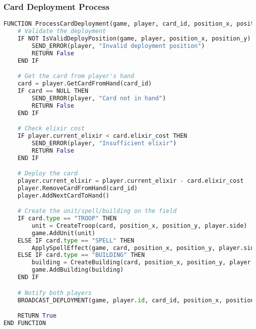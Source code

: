 \documentclass{article}
\begin{document}
\subsubsection{Card Deployment Process}
\begin{lstlisting}[language=Python, caption=Card Deployment]
FUNCTION ProcessCardDeployment(game, player, card_id, position_x, position_y):
    # Validate the deployment
    IF NOT IsValidDeployPosition(game, player, position_x, position_y) THEN
        SEND_ERROR(player, "Invalid deployment position")
        RETURN False
    END IF

    # Get the card from player's hand
    card = player.GetCardFromHand(card_id)
    IF card == NULL THEN
        SEND_ERROR(player, "Card not in hand")
        RETURN False
    END IF

    # Check elixir cost
    IF player.current_elixir < card.elixir_cost THEN
        SEND_ERROR(player, "Insufficient elixir")
        RETURN False
    END IF

    # Deploy the card
    player.current_elixir = player.current_elixir - card.elixir_cost
    player.RemoveCardFromHand(card_id)
    player.AddNextCardToHand()

    # Create the unit/spell/building on the field
    IF card.type == "TROOP" THEN
        unit = CreateTroop(card, position_x, position_y, player.side)
        game.AddUnit(unit)
    ELSE IF card.type == "SPELL" THEN
        ApplySpellEffect(game, card, position_x, position_y, player.side)
    ELSE IF card.type == "BUILDING" THEN
        building = CreateBuilding(card, position_x, position_y, player.side)
        game.AddBuilding(building)
    END IF

    # Notify both players
    BROADCAST_DEPLOYMENT(game, player.id, card_id, position_x, position_y)

    RETURN True
END FUNCTION
\end{lstlisting}

\FloatBarrier

\end{document}
